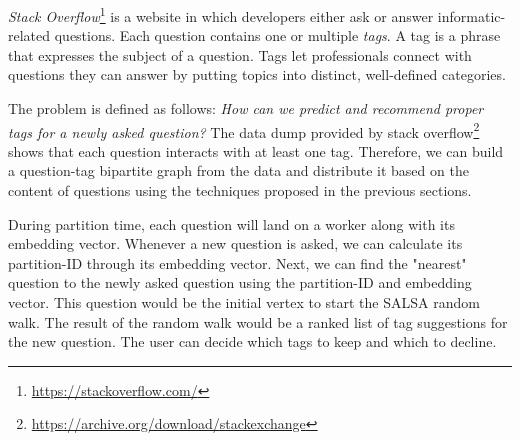 \emph{Stack Overflow}\footnote{\url{https://stackoverflow.com/}} is a website in which developers either ask or answer informatic-related questions. Each question contains one or multiple \emph{tags}. A tag is a phrase that expresses the subject of a question. Tags let professionals connect with questions they can answer by putting topics into distinct, well-defined categories.


The problem is defined as follows: \emph{How can we predict and recommend proper tags for a newly asked question?} The data dump provided by stack overflow\footnote{\url{https://archive.org/download/stackexchange}} shows that each question interacts with at least one tag. Therefore, we can build a question-tag bipartite graph from the data and distribute it based on the content of questions using the techniques proposed in the previous sections.


During partition time, each question will land on a worker along with its embedding vector. Whenever a new question is asked, we can calculate its partition-ID through its embedding vector. Next, we can find the "nearest" question to the newly asked question using the partition-ID and embedding vector. This question would be the initial vertex to start the SALSA random walk. The result of the random walk would be a ranked list of tag suggestions for the new question. The user can decide which tags to keep and which to decline.
